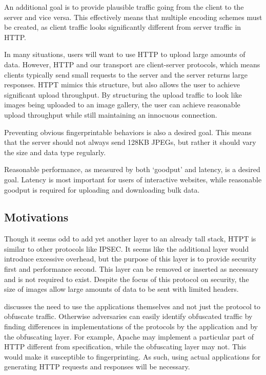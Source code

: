 An additional goal is to provide plausible traffic going from the client to the server and vice versa. This effectively means that multiple encoding schemes must be created, as client traffic looks significantly different from server traffic in HTTP. 

In many situations, users will want to use HTTP to upload large amounts of data. However, HTTP and our transport are client-server protocols, which means clients typically send small requests to the server and the server returns large responses. HTPT mimics this structure, but also allows the user to achieve significant upload throughput. By structuring the upload traffic to look like images being uploaded to an image gallery, the user can achieve reasonable upload throughput while still maintaining an innocuous connection.

Preventing obvious fingerprintable behaviors is also a desired goal. This means that the server should not always send 128KB JPEGs, but rather it should vary the size and data type regularly.  

Reasonable performance, as measured by both `goodput' and latency, is a desired goal. Latency is most important for users of interactive websites, while reasonable goodput is required for uploading and downloading bulk data. 

\subsection{Motivations}
Though it seems odd to add yet another layer to an already tall stack, HTPT is similar to other protocols like IPSEC. It seems like the additional layer would introduce excessive overhead, but the purpose of this layer is to provide security first and performance second. This layer can be removed or inserted as necessary and is not required to exist. Despite the focus of this protocol on security, the size of images allow large amounts of data to be sent with limited headers.

\cite{Ref2} discusses the need to use the applications themselves and not just the protocol to obfuscate traffic. Otherwise adversaries can easily identify obfuscated traffic by finding differences in implementations of the protocols by the application and by the obfuscating layer. For example, Apache may implement a particular part of HTTP different from specification, while the obfuscating layer may not. This would make it susceptible to fingerprinting. As such, using actual applications for generating HTTP requests and responses will be necessary.

